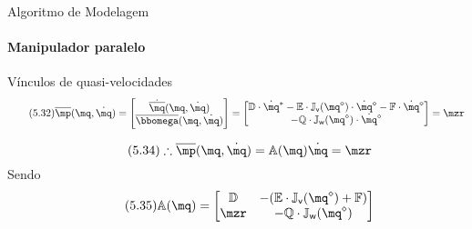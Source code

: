 \documentclass[25pt,landscape]{beamer}
\begin{document}
\begin{frame}{Algoritmo de Modelagem}
    \framesubtitle{Manipulador paralelo}
    \begin{block}{Vínculos de quasi-velocidades}
		\begin{equation} \label{eq:VinculosQuasiVel} \tag{5.32}
			\overline{\mp}(\mq,\dot{\mq}) = 
			\begin{bmatrix}
				\dot{\overline{\mq}}(\mq,\dot{\mq}) \\
				\overline{\momega}(\mq,\dot{\mq})
			\end{bmatrix}
			= 
			\begin{bmatrix}
				\mD \cdot \dot{\mq}^\ast  - \mE \cdot \mJ_{\mathsf{v}}(\mq^\diamond) \cdot \dot{\mq}^\diamond  - \mF \cdot \dot{\mq}^\diamond \\
				 - \mQ \cdot \mJ_{\mathsf{w}}(\mq^\diamond) \cdot \dot{\mq}^\diamond
			\end{bmatrix}
			=
			\mzr
		\end{equation}

		\begin{equation} \label{eq:VinculosQuasiVel2} \tag{5.34}
			\therefore \overline{\mp}(\mq,\dot{\mq}) = \mA(\mq) \dot{\mq} = \mzr
		\end{equation}
		Sendo
		\begin{equation} \tag{5.35}
			\mA(\mq) = 
			\begin{bmatrix}
				\mD  & -(\mE \cdot \mJ_{\mathsf{v}}(\mq^\diamond) + \mF) \\
				\mzr & -\mQ \cdot \mJ_{\mathsf{w}}(\mq^\diamond) \\
			\end{bmatrix}
		\end{equation}
    \end{block}
\end{frame}
\end{document}

